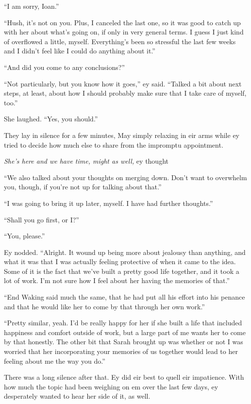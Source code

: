 ``I am sorry, Ioan.''

``Hush, it's not on you. Plus, I canceled the last one, so it was good to catch up with her about what's going on, if only in very general terms. I guess I just kind of overflowed a little, myself. Everything's been so stressful the last few weeks and I didn't feel like I could do anything about it.''

``And did you come to any conclusions?''

``Not particularly, but you know how it goes,'' ey said. ``Talked a bit about next steps, at least, about how I should probably make sure that I take care of myself, too.''

She laughed. ``Yes, you should.''

They lay in silence for a few minutes, May simply relaxing in eir arms while ey tried to decide how much else to share from the impromptu appointment.

\emph{She's here and we have time, might as well,} ey thought

``We also talked about your thoughts on merging down. Don't want to overwhelm you, though, if you're not up for talking about that.''

``I was going to bring it up later, myself. I have had further thoughts.''

``Shall you go first, or I?''

``You, please.''

Ey nodded. ``Alright. It wound up being more about jealousy than anything, and what it was that I was actually feeling protective of when it came to the idea. Some of it is the fact that we've built a pretty good life together, and it took a lot of work. I'm not sure how I feel about her having the memories of that.''

``End Waking said much the same, that he had put all his effort into his penance and that he would like her to come by that through her own work.''

``Pretty similar, yeah. I'd be really happy for her if she built a life that included happiness and comfort outside of work, but a large part of me wants her to come by that honestly. The other bit that Sarah brought up was whether or not I was worried that her incorporating your memories of us together would lead to her feeling about me the way you do.''

There was a long silence after that. Ey did eir best to quell eir impatience. With how much the topic had been weighing on em over the last few days, ey desperately wanted to hear her side of it, as well.

